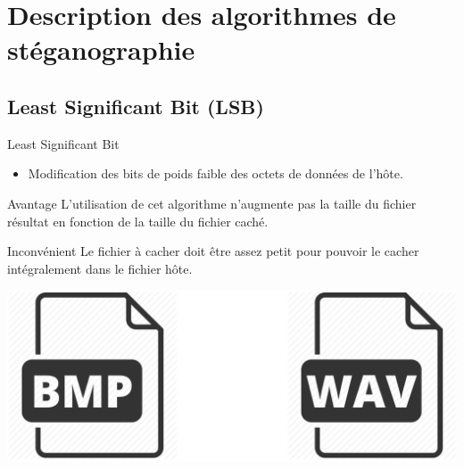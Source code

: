 \documentclass{beamer}
\begin{document}
  
  
  \section{Description des algorithmes de stéganographie} %
  
	\subsection{Least Significant Bit (LSB)}
	\begin{frame}
  
	\begin{block}{Least Significant Bit}
	\begin{itemize}
	[circle]
	\item Modification des bits de poids faible des octets de données de 
	l'hôte. 
	\end{itemize}
	\end{block}
	
	\begin{exampleblock}{Avantage} 
	L'utilisation de cet algorithme n'augmente pas la taille du fichier 
	résultat en fonction de la taille du fichier caché. 
	\end{exampleblock}
	
	\begin{alertblock}{Inconvénient} 
	Le fichier à cacher doit être assez petit pour pouvoir le cacher intégralement 
	dans le fichier hôte. 
	\end{alertblock}
	
	\hspace{3.5cm}
    \includegraphics[scale=0.1]{pictures/lsb.png}
	\end{frame}
  
\end{document}
